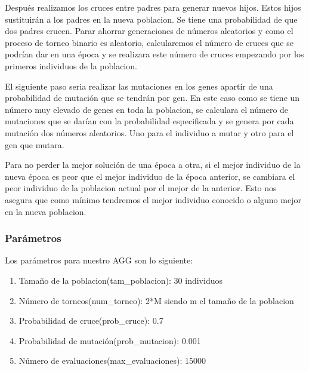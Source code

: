 \documentclass[titlepage]{article}
\begin{document}
	Después realizamos los cruces entre padres para generar nuevos hijos. Estos hijos sustituirán a los padres en la nueva poblacion. Se tiene una probabilidad de que dos padres crucen. Parar ahorrar generaciones de números aleatorios y como el proceso de torneo binario es aleatorio, calcularemos el número de cruces que se podrían dar en una época y se realizara este número de cruces empezando por los primeros individuos de la poblacion. 
	
	El siguiente paso seria realizar las mutaciones en los genes apartir de una probabilidad de mutación que se tendrán por gen. En este caso como se tiene un número muy elevado de genes en toda la poblacion, se calculara el número de mutaciones que se darían con la probabilidad especificada y se genera por cada mutación dos números aleatorios. Uno para el individuo a mutar y otro para el gen que mutara. 
	
	Para no perder la mejor solución de una época a otra, si el mejor individuo de la nueva época es peor que el mejor individuo de la época anterior, se cambiara el peor individuo de la poblacion actual por el mejor de la anterior. Esto nos asegura que como mínimo tendremos el mejor individuo conocido o alguno mejor en la nueva poblacion.
	\subsubsection{Parámetros}
	Los parámetros para nuestro AGG son lo siguiente:
	\begin{enumerate}
		\item Tamaño de la poblacion(tam\_poblacion): 30 individuos
		\item Número de torneos(num\_torneo): 2*M siendo m el tamaño de la poblacion
		\item Probabilidad de cruce(prob\_cruce): 0.7
		\item Probabilidad de mutación(prob\_mutacion): 0.001
		\item Número de evaluaciones(max\_evaluaciones): 15000
	\end{enumerate}
	\newpage
\end{document}
